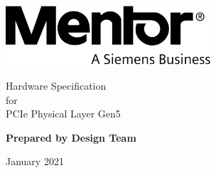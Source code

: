 \begin{titlepage}
    \begin{center}
\includegraphics[height=0.9in,width=3in]{images/mentor.png}
        \vspace*{3cm}
            
        \Huge
        Hardware Specification
        \\
            for
        \\
        PCIe Physical Layer Gen5
        \\
        \vspace{0.5cm}

        \vspace{1.5cm}
            
        \textbf{Prepared by Design Team}
            
         \vspace{6cm}
      
         January 2021
            
    \end{center}
\end{titlepage}
